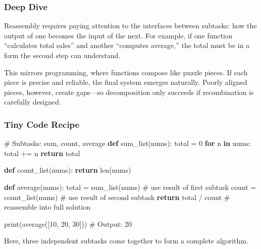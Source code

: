 \documentclass[
  letterpaper,
  DIV=11,
  numbers=noendperiod]{scrreprt}
\newenvironment{Shaded}{\begin{snugshade}}{\end{snugshade}}
\newcommand{\BuiltInTok}[1]{\textcolor[rgb]{0.00,0.23,0.31}{#1}}
\newcommand{\CommentTok}[1]{\textcolor[rgb]{0.37,0.37,0.37}{#1}}
\newcommand{\ControlFlowTok}[1]{\textcolor[rgb]{0.00,0.23,0.31}{\textbf{#1}}}
\newcommand{\DecValTok}[1]{\textcolor[rgb]{0.68,0.00,0.00}{#1}}
\newcommand{\KeywordTok}[1]{\textcolor[rgb]{0.00,0.23,0.31}{\textbf{#1}}}
\newcommand{\NormalTok}[1]{\textcolor[rgb]{0.00,0.23,0.31}{#1}}
\newcommand{\OperatorTok}[1]{\textcolor[rgb]{0.37,0.37,0.37}{#1}}
\begin{document}
\subsubsection{Deep Dive}\label{deep-dive-6}

Reassembly requires paying attention to the interfaces between subtasks:
how the output of one becomes the input of the next. For example, if one
function ``calculates total sales'' and another ``computes average,''
the total must be in a form the second step can understand.

This mirrors programming, where functions compose like puzzle pieces. If
each piece is precise and reliable, the final system emerges naturally.
Poorly aligned pieces, however, create gaps---so decomposition only
succeeds if recombination is carefully designed.

\subsubsection{Tiny Code Recipe}\label{tiny-code-recipe-34}

\begin{Shaded}
\begin{Highlighting}[]
\CommentTok{\# Subtasks: sum, count, average}
\KeywordTok{def}\NormalTok{ sum\_list(nums):}
\NormalTok{    total }\OperatorTok{=} \DecValTok{0}
    \ControlFlowTok{for}\NormalTok{ n }\KeywordTok{in}\NormalTok{ nums:}
\NormalTok{        total }\OperatorTok{+=}\NormalTok{ n}
    \ControlFlowTok{return}\NormalTok{ total}

\KeywordTok{def}\NormalTok{ count\_list(nums):}
    \ControlFlowTok{return} \BuiltInTok{len}\NormalTok{(nums)}

\KeywordTok{def}\NormalTok{ average(nums):}
\NormalTok{    total }\OperatorTok{=}\NormalTok{ sum\_list(nums)           }\CommentTok{\# use result of first subtask}
\NormalTok{    count }\OperatorTok{=}\NormalTok{ count\_list(nums)         }\CommentTok{\# use result of second subtask}
    \ControlFlowTok{return}\NormalTok{ total }\OperatorTok{/}\NormalTok{ count             }\CommentTok{\# reassemble into full solution}

\BuiltInTok{print}\NormalTok{(average([}\DecValTok{10}\NormalTok{, }\DecValTok{20}\NormalTok{, }\DecValTok{30}\NormalTok{]))  }\CommentTok{\# Output: 20}
\end{Highlighting}
\end{Shaded}

Here, three independent subtasks come together to form a complete
algorithm.
\end{document}
